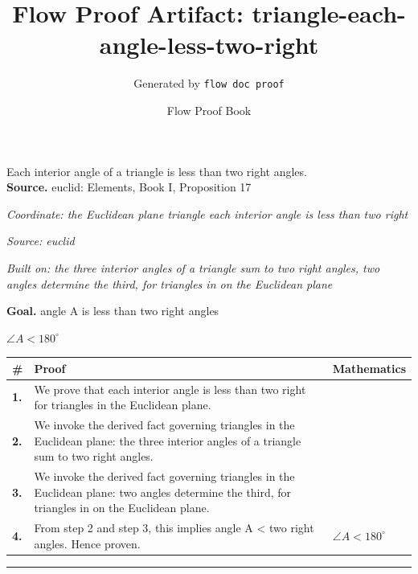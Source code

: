 \documentclass[11pt]{article}
\title{Flow Proof Artifact: triangle-each-angle-less-two-right}
\author{Generated by \texttt{flow doc proof}}
\date{Flow Proof Book}
\theoremstyle{definition}
\begin{document}
\maketitle
Each interior angle of a triangle is less than two right angles.\\[0.5em]
\textbf{Source.} euclid: Elements, Book I, Proposition 17\\[0.5em]
\bigskip
{}\par
\smallskip\noindent\textit{Coordinate: the Euclidean plane \cdot triangle \cdot each interior angle is less than two right}\par
\smallskip\noindent\textit{Source: euclid}\par
\smallskip\noindent\textit{Built on: the three interior angles of a triangle sum to two right angles, two angles determine the third, for triangles in on the Euclidean plane}\par
\medskip
\noindent\textbf{Goal.} angle A is less than two right angles\par
\noindent$\displaystyle \angle A < 180^\circ$\par
\medskip
\noindent
\begin{tabular}{@{} >{\raggedright\arraybackslash}p{} >{\raggedright\arraybackslash}p{} >{\raggedleft\arraybackslash}p{} @{}}
\textbf{\#} & \textbf{Proof} & \textbf{Mathematics} \\
\midrule
\textbf{1.} & We prove that each interior angle is less than two right for triangles in the Euclidean plane. & \\[0.45em]
\textbf{2.} & We invoke the derived fact governing triangles in the Euclidean plane: the three interior angles of a triangle sum to two right angles. & \\[0.45em]
\textbf{3.} & We invoke the derived fact governing triangles in the Euclidean plane: two angles determine the third, for triangles in on the Euclidean plane. & \\[0.45em]
\textbf{4.} & From step 2 and step 3, this implies angle A < two right angles. Hence proven. & $\displaystyle \angle A < 180^\circ$ \\[0.45em]
\bottomrule
\end{tabular}
\label{thm:Geometry-triangle-each_interior_angle_is_less_than_two_right}
\par\medskip\hrule
\end{document}
